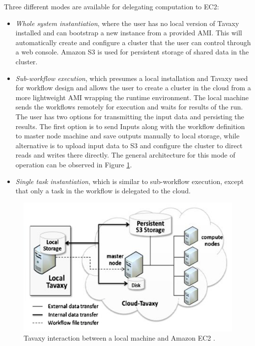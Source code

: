 \documentclass[11pt,a4paper]{report}
\begin{document}
Three different modes are available for delegating computation to EC2:

\begin{itemize}
	\item \textit{Whole system instantiation}, where the user has no local version of Tavaxy installed and can bootstrap a new instance from a provided AMI. This will automatically create and configure a cluster that the user can control through a web console. Amazon S3 \cite{S3} is used for persistent storage of shared data in the cluster.
	\item \textit{Sub-workflow execution}, which presumes a local installation and Tavaxy used for workflow design and allows the user to create a cluster in the cloud from a more lightweight AMI wrapping the runtime environment. The local machine sends the workflows remotely for execution and waits for results of the run. The user has two options for transmitting the input data and persisting the results. The first option is to send Inputs along with the workflow definition to master node machine and save outputs manually to local storage, while alternative is to upload input data to S3 and configure the cluster to direct reads and writes there directly. The general architecture for this mode of operation can be observed in Figure \ref{TavaxyArch}.
	\item \textit{Single task instantiation}, which is similar to sub-workflow execution, except that only a task in the workflow is delegated to the cloud.
\end{itemize}

\vspace{5mm}
\begin{figure}[h]
	\centering
		\includegraphics[scale=0.25]{figures/TavaxyArch.png}
	\caption{Tavaxy interaction between a local machine and Amazon EC2 \cite{Abouelhoda2012}.}
	\label{TavaxyArch}
\end{figure}
\end{document}
